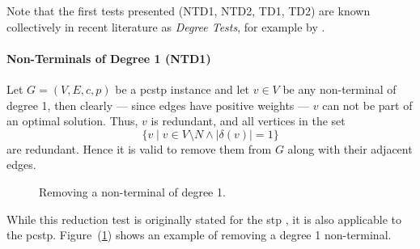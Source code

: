  Note that the first tests presented (NTD1, NTD2, TD1, TD2) are known collectively
 in recent literature as \textit{Degree Tests}, for example by \citet{rehfeldt2016reduction}.
\paragraph{Non-Terminals of Degree 1 (NTD1)}\label{sec:red:test:deg1}
Let $G = (V, E, c, p)$ be a \gls{pcstp} instance and let $v \in V$ be any non-terminal of degree 1, then
clearly
--- since edges have positive weights ---
$v$ can not be part of an optimal solution.
Thus, $v$ is redundant, and
 all vertices in the set
 \[\{v \mid v \in V \setminus N \wedge |\delta(v)| = 1\}\]
 are redundant. Hence it is valid to remove them from $G$ along with their adjacent edges.

\begin{figure}[h]\centering
  \caption{Removing a non-terminal of degree 1.}\label{fig:red:test:deg1}
\end{figure}

 While this reduction test is originally stated for the \gls{stp} \citep{hwang1992steiner}, it is also applicable to the \gls{pcstp}. Figure~(\ref{fig:red:test:deg1})
  shows an example of removing a degree 1 non-terminal.

